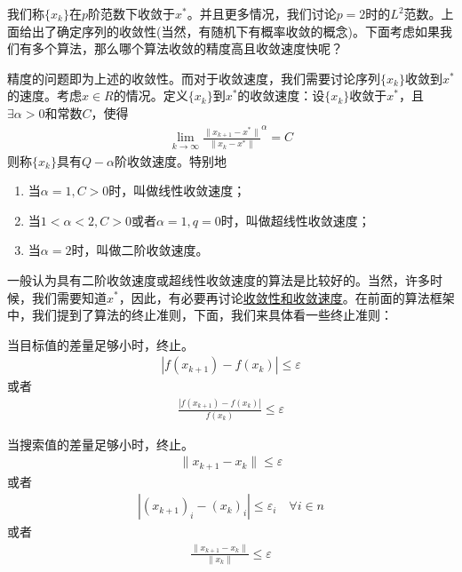     我们称$\{x_k\}$在$p$阶范数下收敛于$x^*$。并且更多情况，我们讨论$p=2$时的$L^2$范数。上面给出了确定序列的收敛性(当然，有随机下有概率收敛的概念)。下面考虑如果我们有多个算法，那么哪个算法收敛的精度高且收敛速度快呢？
    \par
    精度的问题即为上述的收敛性。而对于收敛速度，我们需要讨论序列$\{x_k\}$收敛到$x^{*}$的速度。考虑$x \in R$的情况。定义$\{x_k\}$到$x^{*}$的收敛速度：设$\{x_k\}$收敛于$x^{*}$，且$\exists \alpha > 0$和常数$C$，使得
    \begin{align*}
    \mathop {\lim}\limits_{k \to \infty } \frac{\|x_{k+1}-x^{*}\|}{\|x_k-x^{*}\|}^{\alpha }=C
    \end{align*}
    则称$\{x_k\}$具有$Q - \alpha$阶收敛速度。特别地
    \begin{enumerate}
    \item 当$\alpha = 1,C>0$时，叫做线性收敛速度；
    \item 当$1<\alpha <2,C>0$或者$\alpha =1,q = 0$时，叫做超线性收敛速度；
    \item 当$\alpha = 2$时，叫做二阶收敛速度。
    \end{enumerate}
    \par
    一般认为具有二阶收敛速度或超线性收敛速度的算法是比较好的。当然，许多时候，我们需要知道$x^*$，因此，有必要再讨论\underline{收敛性和收敛速度}。在前面的算法框架中，我们提到了算法的终止准则，下面，我们来具体看一些终止准则：
    \par
    当目标值的差量足够小时，终止。
        \begin{align*}
        |f(x_{k+1})-f(x_{k})|\le \varepsilon
        \end{align*}
        或者
        \begin{align*}
        \frac {|f(x_{k+1})-f(x_{k})|}{f(x_k)}\le \varepsilon
        \end{align*}
    \par
    当搜索值的差量足够小时，终止。
        \begin{align*}
        \|x_{k+1}-x_{k}\|\le \varepsilon
        \end{align*}
        或者
        \begin{align*}
        |(x_{k+1})_i-(x_{k})_i|\le {\varepsilon}_i\quad \forall i \in n
        \end{align*}
        或者
        \begin{align*}
        \frac {\|x_{k+1}-x_{k}\|}{\|x_k\|}\le \varepsilon
        \end{align*}
    \par

